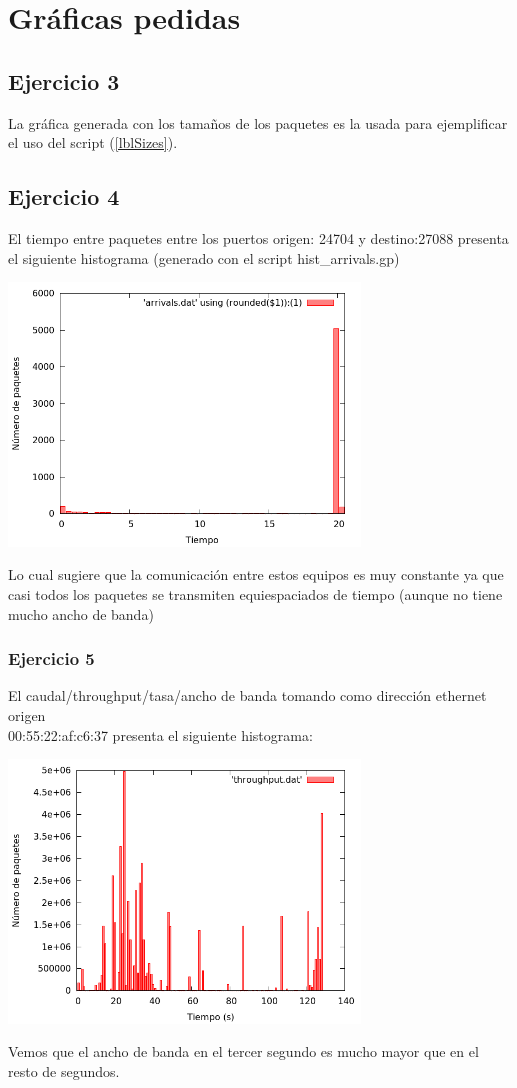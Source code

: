 \documentclass[nochap]{apuntes}
\begin{document}
\newpage

\section{Gr\'aficas pedidas}
\subsection{Ejercicio 3}
La gráfica generada con los tamaños de los paquetes es la usada para ejemplificar el uso del script (\ref{lblSizes}).
\subsection{Ejercicio 4}

El tiempo entre paquetes entre los puertos origen: 24704 y destino:27088 presenta el siguiente histograma (generado con el script hist\_arrivals.gp)

	\begin{center}
	\includegraphics[width=0.7\textwidth]{imgs/Memoria/mem_arrivals_5.png}
	\end{center}


Lo cual sugiere que la comunicación entre estos equipos es muy constante ya que casi todos los paquetes se transmiten equiespaciados de tiempo (aunque no tiene mucho ancho de banda)

\subsubsection{Ejercicio 5}

El caudal/throughput/tasa/ancho de banda tomando como dirección ethernet origen \\00:55:22:af:c6:37 presenta el siguiente histograma:

\begin{center}
	\includegraphics[width=0.7\textwidth]{imgs/Memoria/throughput.png}
\end{center}

Vemos que el ancho de banda en el tercer segundo es mucho mayor que en el resto de segundos.
\end{document}
